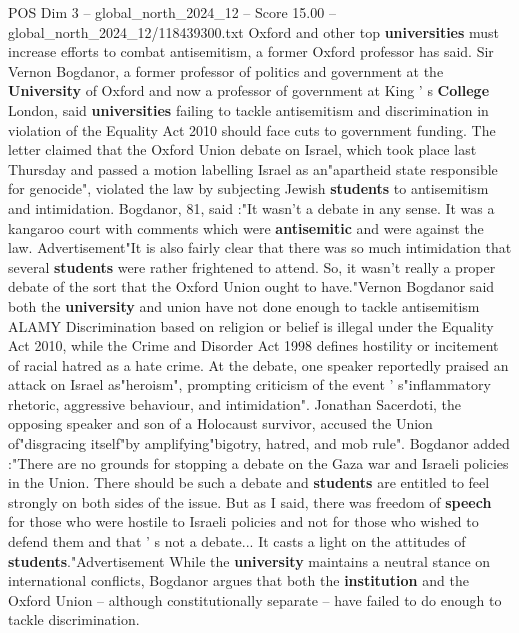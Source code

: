\begin{textsample}{POS Dim 3 – global\_north\_2024\_12 – Score 15.00 – global\_north\_2024\_12/118439300.txt}  \label{ex:f3_pos_237}
Oxford and other top \textbf{universities} must increase efforts to combat antisemitism, a former Oxford professor has said.
Sir Vernon Bogdanor, a former professor of politics and government at the \textbf{University} of Oxford and now a professor of government at King ' s \textbf{College} London, said \textbf{universities} failing to tackle antisemitism and discrimination in violation of the Equality Act 2010 should face cuts to government funding.
The letter claimed that the Oxford Union debate on Israel, which took place last Thursday and passed a motion labelling Israel as an"apartheid state responsible for genocide", violated the law by subjecting Jewish \textbf{students} to antisemitism and intimidation.
Bogdanor, 81, said :"It wasn't a debate in any sense.
It was a kangaroo court with comments which were \textbf{antisemitic} and were against the law.
Advertisement"It is also fairly clear that there was so much intimidation that several \textbf{students} were rather frightened to attend.
So, it wasn't really a proper debate of the sort that the Oxford Union ought to have."Vernon Bogdanor said both the \textbf{university} and union have not done enough to tackle antisemitism ALAMY Discrimination based on religion or belief is illegal under the Equality Act 2010, while the Crime and Disorder Act 1998 defines hostility or incitement of racial hatred as a hate crime.
At the debate, one speaker reportedly praised an attack on Israel as"heroism", prompting criticism of the event ' s"inflammatory rhetoric, aggressive behaviour, and intimidation".
Jonathan Sacerdoti, the opposing speaker and son of a Holocaust survivor, accused the Union of"disgracing itself"by amplifying"bigotry, hatred, and mob rule".
Bogdanor added :"There are no grounds for stopping a debate on the Gaza war and Israeli policies in the Union.
There should be such a debate and \textbf{students} are entitled to feel strongly on both sides of the issue.
But as I said, there was freedom of \textbf{speech} for those who were hostile to Israeli policies and not for those who wished to defend them and that ' s not a debate...
It casts a light on the attitudes of \textbf{students}."Advertisement While the \textbf{university} maintains a neutral stance on international conflicts, Bogdanor argues that both the \textbf{institution} and the Oxford Union -- although constitutionally separate -- have failed to do enough to tackle discrimination.

\end{textsample}
